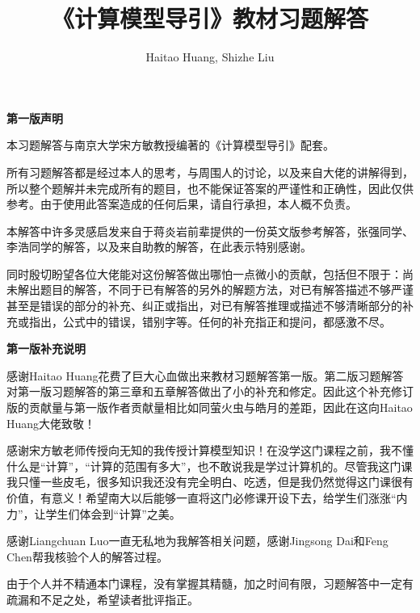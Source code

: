 \documentclass[a4paper,twoside]{article}
\title{\bf 《计算模型导引》教材习题解答}
\author{Haitao Huang, Shizhe Liu}
\date{}
\begin{document}
\begin{titlepage}
\maketitle
\thispagestyle{empty}
\end{titlepage}
\begin{center}
\bf\LARGE 第一版声明
\end{center}

本习题解答与南京大学宋方敏教授编著的《计算模型导引》配套。

所有习题解答都是经过本人的思考，与周围人的讨论，以及来自大佬的讲解得到，所以整个题解并未完成所有的题目，也不能保证答案的严谨性和正确性，因此仅供参考。由于使用此答案造成的任何后果，请自行承担，本人概不负责。

本解答中许多灵感启发来自于蒋炎岩前辈提供的一份英文版参考解答，张强同学、李浩同学的解答，以及来自助教的解答，在此表示特别感谢。

同时殷切盼望各位大佬能对这份解答做出哪怕一点微小的贡献，包括但不限于：尚未解出题目的解答，不同于已有解答的另外的解题方法，对已有解答描述不够严谨甚至是错误的部分的补充、纠正或指出，对已有解答推理或描述不够清晰部分的补充或指出，公式中的错误，错别字等。任何的补充指正和提问，都感激不尽。



\begin{center}
\bf\LARGE 第一版补充说明
\end{center}

感谢Haitao Huang花费了巨大心血做出来教材习题解答第一版。第二版习题解答对第一版习题解答的第三章和五章解答做出了小的补充和修定。因此这个补充修订版的贡献量与第一版作者贡献量相比如同萤火虫与皓月的差距，因此在这向Haitao Huang大佬致敬！

感谢宋方敏老师传授向无知的我传授计算模型知识！在没学这门课程之前，我不懂什么是“计算”，“计算的范围有多大”，也不敢说我是学过计算机的。尽管我这门课我只懂一些皮毛，很多知识我还没有完全明白、吃透，但是我仍然觉得这门课很有价值，有意义！希望南大以后能够一直将这门必修课开设下去，给学生们涨涨“内力”，让学生们体会到“计算”之美。

感谢Liangchuan Luo一直无私地为我解答相关问题，感谢Jingsong Dai和Feng Chen帮我核验个人的解答过程。

由于个人并不精通本门课程，没有掌握其精髓，加之时间有限，习题解答中一定有疏漏和不足之处，希望读者批评指正。

\end{document}
